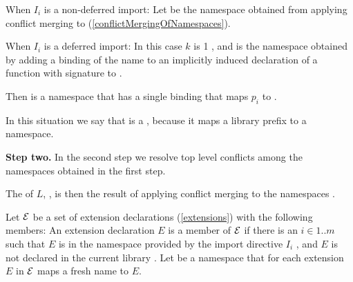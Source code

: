 \documentclass[makeidx]{article}
\begin{document}
{\LMHash{}%
When $I_i$ is a non-deferred import:
Let  be the namespace obtained from applying
conflict merging to
(\ref{conflictMergingOfNamespaces}).

\LMHash{}%
When $I_i$ is a deferred import:
In this case $k$ is 1
,
and  is the namespace obtained by
adding a binding of the name 
to an implicitly induced declaration of a function with signature
to .

\LMHash{}%
Then  is a namespace that has
a single binding that maps $p_i$ to .

\LMHash{}%
In this situation we say that  is a
,
because it maps a library prefix to a namespace.

\EndCase

\LMHash{}%
{\bf Step two.}
In the second step we resolve top level conflicts
among the namespaces obtained in the first step.

\LMHash{}%
The  of $L$, ,
is then the result of applying conflict merging to the namespaces
.

\LMHash{}%
Let $\cal E$ be a set of extension declarations
(\ref{extensions})
with the following members:
An extension declaration $E$ is a member of $\cal E$
if there is an $i \in 1 .. m$ such that
$E$ is in the namespace provided by the import directive $I_i$
,
and $E$ is not declared in the current library
.
Let  be a namespace that
for each extension $E$ in $\cal E$ maps a fresh name to $E$.

}
\end{document}
